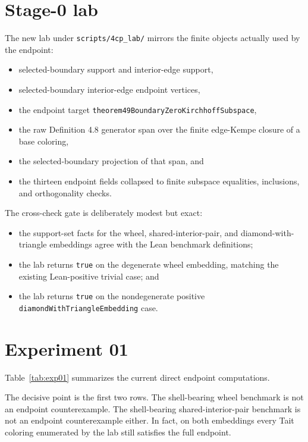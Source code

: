 \documentclass[11pt]{article}
\begin{document}
\section{Stage-0 lab}

The new lab under \verb|scripts/4cp_lab/| mirrors the finite objects actually
used by the endpoint:
\begin{itemize}[leftmargin=2em]
\item selected-boundary support and interior-edge support,
\item selected-boundary interior-edge endpoint vertices,
\item the endpoint target
  \verb|theorem49BoundaryZeroKirchhoffSubspace|,
\item the raw Definition 4.8 generator span over the finite edge-Kempe
  closure of a base coloring,
\item the selected-boundary projection of that span, and
\item the thirteen endpoint fields collapsed to finite subspace equalities,
  inclusions, and orthogonality checks.
\end{itemize}

The cross-check gate is deliberately modest but exact:
\begin{itemize}[leftmargin=2em]
\item the support-set facts for the wheel, shared-interior-pair, and
  diamond-with-triangle embeddings agree with the Lean benchmark definitions;
\item the lab returns \verb|true| on the degenerate wheel embedding, matching
  the existing Lean-positive trivial case; and
\item the lab returns \verb|true| on the nondegenerate positive
  \verb|diamondWithTriangleEmbedding| case.
\end{itemize}

\section{Experiment 01}

Table~\ref{tab:exp01} summarizes the current direct endpoint computations.

\begin{table}[h]
\centering
\resizebox{\textwidth}{!}{}
\caption{Stage-0 endpoint verdicts on the current small benchmark family.}
\label{tab:exp01}
\end{table}

The decisive point is the first two rows.  The shell-bearing wheel benchmark is
not an endpoint counterexample.  The shell-bearing shared-interior-pair
benchmark is not an endpoint counterexample either.  In fact, on both
embeddings every Tait coloring enumerated by the lab still satisfies the full
endpoint.
\end{document}

